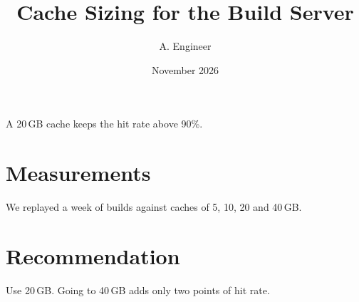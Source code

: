 \documentclass{report-note}
\title{Cache Sizing for the Build Server}
\author{A. Engineer}
\date{November 2026}
\begin{document}
\maketitle

\begin{summarybox}
A 20\,GB cache keeps the hit rate above 90\%.
\end{summarybox}

\section{Measurements}
We replayed a week of builds against caches of 5, 10, 20 and 40\,GB.

\section{Recommendation}
Use 20\,GB. Going to 40\,GB adds only two points of hit rate.
\end{document}
